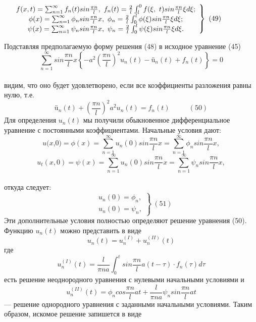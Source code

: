 \documentclass{article}
\begin{document}
\begin{math}
\left.
\begin{array}{cc}
     &f(x,t) = \sum_{n = 1}^{\infty }f_{n}(t)sin\frac{\pi n}{l}, \ f_{n}(t)=\tfrac{2}{l}\int_{l}^{0}f(\xi, \ t)sin\frac{\pi n}{l}\xi d \xi; \\
     &\phi(x) = \sum_{n = 1 }^{\infty} \phi_{n}sin\tfrac{\pi n}{l}x, \ \phi_{n}= \frac{2}{l}\int_{0}^{l}\phi(\xi)sin\frac{\pi n}{l}\xi d\xi; \\
     &\psi(x) = \sum_{n=1}^{\infty } \psi_{n}sin\frac{\pi n}{l}x, \ \psi_{n}= \frac{2}{l}\int_{0}^{l}\psi(\xi)sin\frac{\pi n}{l}\xi d\xi. 
\end{array}
\right\} \ (49) \\
\end{math}

Подставляя предполагаемую форму решения (48) в исходное уравнение (45) \\ 
\[\sum_{n=1}^{\infty } sin \frac{\pi n}{l}x\left\{ -a^{2}(\frac{\pi n}{l})^{2}u_{n}(t) - ü_{n}(t)+f_{n}(t) \right\} = 0\] \\
видим, что оно будет удовлетворено, если все коэффициенты разложения равны нулю, т.е. \\
\[ü_{n}(t) + (\frac{\pi n}{l})^{2} a^{2}u_{n}(t)=f_{n}(t) \ \ \ \ \ \ \ \ \ \ \ \ (50)\] 
Для определения \(u_{n}(t)\) мы получили обыкновенное дифференциальное уравнение с постоянными коэффициентами. Начальные условия дают: \\

\[
\textit{u(x,0)} = \phi(x)=\sum_{n=1}^{\infty } u_{n}(0)sin\frac{\pi n}{l}x = \sum_{n=1}^{\infty }\phi_{n}sin\frac{\pi n}{l}x,\] 
\[u_{t}(x,0) = \psi(x) = \sum_{n=1}^{\infty } u_{n}(0)sin\frac{\pi n}{l}x=\sum_{n=1}^{\infty }\psi_{n}sin\frac{\pi n}{l}x,\] \\
откуда следует: \\
\[
\left.
\begin{array}{cc}
     &u_{n}(0) = \phi_{n}, \\
     &u_{n}(0) = \psi_{n},
\end{array}
\right\} \ (51) 
\]
Эти дополнительные условия полностью определяют решение уравнения (50). Функцию \(u_{n}(t)\) можно представить в виде
\[u_{n}(t)=u_{n}^{(I)} + u_{n}^{(II)} (t)\]
где
\[u_{n}^{(I)}(t)=\frac{l}{\pi na}\int_{0}^{t}sin\frac{\pi n}{l}a(t-\tau) \cdot f_{n}(\tau)d\tau\]
есть решение неоднородного уравнения с нулевыми начальными условиями и 
\[u_{n}^{(II)}(t)=\phi_{n}cos \frac{\pi n}{l}at+\frac{l}{\pi n a}\psi_{n}sin\frac{\pi n}{l}at\]
--- решение однородного уравнения с заданными начальными условиями. Таким образом, искомое решение запишется в виде
\end{document}
